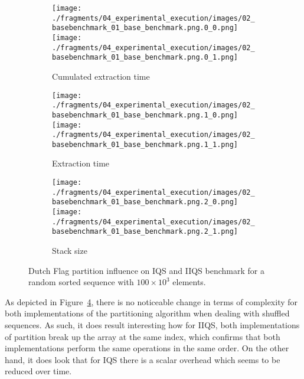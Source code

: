 \begin{figure}
    \centering
    \begin{subfigure}[b]{\textwidth}
        \centering
        \texttt{[image: ./fragments/04\_experimental\_execution/images/02\_basebenchmark\_01\_base\_benchmark.png.0\_0.png]}
        \texttt{[image: ./fragments/04\_experimental\_execution/images/02\_basebenchmark\_01\_base\_benchmark.png.0\_1.png]}
        \caption{Cumulated extraction time}
        \label{FIG:PARTITION_SCHEME_01_SHUFFLED__0_0}
    \end{subfigure}

    \begin{subfigure}[b]{\textwidth}
        \centering
        \texttt{[image: ./fragments/04\_experimental\_execution/images/02\_basebenchmark\_01\_base\_benchmark.png.1\_0.png]}
        \texttt{[image: ./fragments/04\_experimental\_execution/images/02\_basebenchmark\_01\_base\_benchmark.png.1\_1.png]}
        \caption{Extraction time}
        \label{FIG:PARTITION_SCHEME_01_SHUFFLED__0_1}
    \end{subfigure}

    \begin{subfigure}[b]{\textwidth}
        \centering
        \texttt{[image: ./fragments/04\_experimental\_execution/images/02\_basebenchmark\_01\_base\_benchmark.png.2\_0.png]}
        \texttt{[image: ./fragments/04\_experimental\_execution/images/02\_basebenchmark\_01\_base\_benchmark.png.2\_1.png]}
        \caption{Stack size}
        \label{FIG:PARTITION_SCHEME_01_SHUFFLED__0_2}
    \end{subfigure}
    
    \caption{Dutch Flag partition influence on IQS and IIQS benchmark for a random sorted sequence with $100\times10^3$ elements.}
    \label{FIG:PARTITION_SCHEME_01_SHUFFLED}
\end{figure}


As depicted in Figure~\ref{FIG:PARTITION_SCHEME_01_SHUFFLED}, there is no noticeable change in terms of complexity for both implementations of the partitioning algorithm when dealing with shuffled sequences. As such, it does result interesting how for IIQS, both implementations of partition break up the array at the same index, which confirms that both implementations perform the same operations in the same order. On the other hand, it does look that for IQS there is a scalar overhead which seems to be reduced over time. \\



